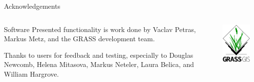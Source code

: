 \documentclass[xcolor={dvipsnames,usenames},beamer,aspectratio=169]{beamer}
\begin{document}
\begin{frame}{Acknowledgements}

\begin{columns}
\begin{column}{0.6\textwidth}

\begin{block}{Software}
Presented functionality is work done by Vaclav Petras, Markus Metz, and the GRASS development team.

\bigskip

Thanks to users for feedback and testing, especially to
Douglas Newcomb, Helena Mitasova, Markus Neteler, Laura Belica, and William Hargrove.
\end{block}

\end{column}
\begin{column}{0.3\textwidth}

\begin{center}
  \includegraphics[width=\textwidth]{logos/grass_gis}
\end{center}

\end{column}
\end{columns}

\end{frame}
\end{document}
